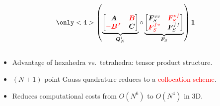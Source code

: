 \documentclass[compress]{beamer}
\theoremstyle{plain}
\newcommand{\LRp}[1]{\left( #1 \right)}
\renewcommand{\note}[1]{\textcolor{red}{{#1}}}
\begin{document}
{\begin{columns}
\begin{column}{.51\textwidth}
\[{}
\only<4>{
\LRp{\underbrace{\begin{bmatrix}
\bm{A} & \note{\bm{B}}\\
\note{-\bm{B}^T} & \bm{C}
\end{bmatrix}}_{\bm{Q}_N^i} \circ
\underbrace{\begin{bmatrix}
\bm{F}^{vv}_S & \note{\bm{F}^{vf}_S}\\
\note{\bm{F}^{fv}_S} & \bm{F}^{ff}_S
\end{bmatrix}}_{\bm{F}_S} } \bm{1}
}
\]
\end{column}
\end{columns}
\vspace{.5em}
\begin{itemize}
\item Advantage of hexahedra vs.\ tetrahedra: tensor product structure.
\vspace{.5em}
\item $(N+1)$-point Gauss quadrature reduces to a \note{collocation scheme}.  
\vspace{.5em}
\item Reduces computational costs from $O(N^6)$ to $O(N^4)$ in 3D.
\vspace{.5em}
\end{itemize} 
}
\end{document}
